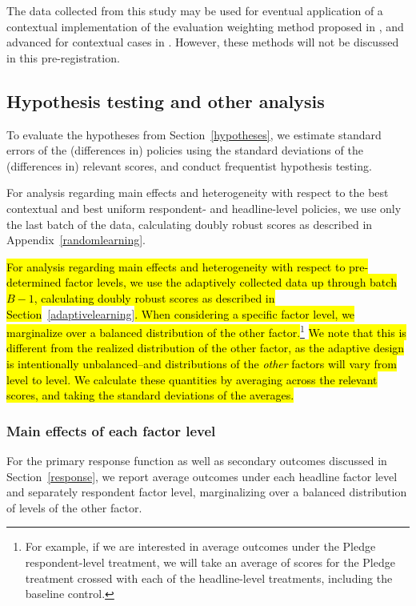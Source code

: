 \documentclass[letterpaper, 12pt, parskip=full,]{scrartcl}
\begin{document}
The data collected from this study may be used for eventual application of a contextual implementation of the evaluation weighting method proposed in \cite{hadad2019confidence}, and advanced for contextual cases in \cite{zhan2020retrospective}. However, these methods will not be discussed in this pre-registration. 


\subsection{Hypothesis testing and other analysis}
To evaluate the hypotheses from Section~\ref{hypotheses}, we estimate standard errors of the (differences in) policies using the standard deviations of the (differences in) relevant scores, and conduct frequentist hypothesis testing. 

For analysis regarding main effects and heterogeneity with respect to the best contextual and best uniform respondent- and headline-level policies, we use only the last batch of the data, calculating doubly robust scores as described in Appendix~\ref{randomlearning}. 

\hl{For analysis regarding main effects and heterogeneity with respect to pre-determined factor levels, we use the adaptively collected data up through batch $B-1$, calculating doubly robust scores as described in Section}~\ref{adaptivelearning}\hl{. When considering a specific factor level, we marginalize over a balanced distribution of the other factor.}\footnote{For example, if we are interested in average outcomes under the Pledge respondent-level treatment, we will take an average of scores for the Pledge treatment crossed with each of the headline-level treatments, including the baseline control.} %
\hl{We note that this is different from the realized distribution of the other factor, as the adaptive design is intentionally unbalanced--and distributions of the \textit{other} factors will vary from level to level. We calculate these quantities by averaging across the relevant scores, and taking the standard deviations of the averages. }

\subsubsection{Main effects of each factor level}\label{main}
For the primary response function as well as secondary outcomes discussed in Section~\ref{response}, we report average outcomes under each headline factor level and separately respondent factor level, marginalizing over a balanced distribution of levels of the other factor.
\end{document}
